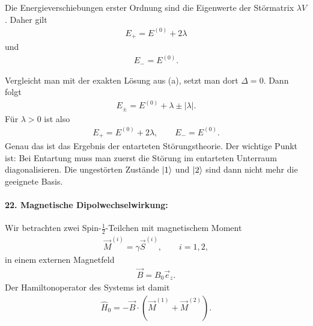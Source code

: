 \documentclass[11pt,a4paper]{scrartcl}
\newcommand{\abs}[1]{\left| #1 \right|}
\newcommand{\op}[1]{\hat{#1}}
\begin{document}
\begin{enumerate}[label=(\alph*)]
\begin{calculationbox}
            \begin{calculationbox}[title=Energien bis erster Ordnung]
                Die Energieverschiebungen erster Ordnung sind die Eigenwerte der Störmatrix $\lambda V$. Daher gilt
                \begin{align*}
                    \boxed{
                    E_+
                    =
                    E^{(0)}+2\lambda}
                \end{align*}
                und
                \begin{align*}
                    \boxed{
                    E_-
                    =
                    E^{(0)}}.
                \end{align*}
            \end{calculationbox}

            \begin{solutionbox}
                Vergleicht man mit der exakten Lösung aus (a), setzt man dort $\Delta=0$. Dann folgt
                \begin{align*}
                    E_\pm
                    =
                    E^{(0)}+\lambda\pm\abs{\lambda}.
                \end{align*}
                Für $\lambda>0$ ist also
                \begin{align*}
                    E_+=E^{(0)}+2\lambda,
                    \qquad
                    E_-=E^{(0)}.
                \end{align*}
                Genau das ist das Ergebnis der entarteten Störungstheorie. Der wichtige Punkt ist: Bei Entartung muss man zuerst die Störung im entarteten Unterraum diagonalisieren. Die ungestörten Zustände $\ket{1}$ und $\ket{2}$ sind dann nicht mehr die geeignete Basis.
            \end{solutionbox}
        \end{calculationbox}
    \end{enumerate}

    \paragraph{22. Magnetische Dipolwechselwirkung:}

    Wir betrachten zwei Spin-$\frac12$-Teilchen mit magnetischem Moment
    \begin{align*}
        \vec M^{(i)}=\gamma \vec S^{(i)},
        \qquad
        i=1,2,
    \end{align*}
    in einem externen Magnetfeld
    \begin{align*}
        \vec B=B_0\vec e_z.
    \end{align*}
    Der Hamiltonoperator des Systems ist damit
    \begin{align*}
        \op H_0
        =
        -\vec B\cdot(\vec M^{(1)}+\vec M^{(2)}).
    \end{align*}
\end{document}
